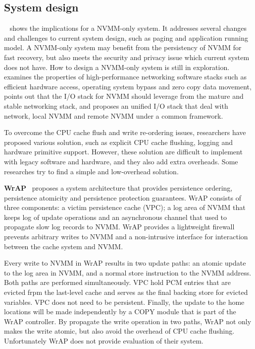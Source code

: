 \subsection{System design} 
\label{sec:systemdesign}

~\cite{systemimplications} shows the implications for a NVMM-only
system. It addresses several changes and challenges to current system design,
such as paging and application running model. A NVMM-only system may benefit
from the persistency of NVMM for fast recovery, but also meets the security
and privacy issue which current system does not have. How to design a
NVMM-only system is still in exploration. \cite{onestack} examines the
properties of high-performance networking software stacks such as efficient
hardware access, operating system bypass and zero copy data movement,
points out that the I/O stack for NVMM should leverage from the mature and
stable networking stack, and proposes an unified I/O stack that deal with
network, local NVMM and remote NVMM under a common framework.

To overcome the CPU cache flush and write re-ordering issues, researchers
have proposed various solution, such as explicit CPU cache flushing, logging
and hardware primitive support. However, these solution are difficult
to implement with legacy software and hardware, and they also add extra
overheads. Some researches try to find a simple and low-overhead solution.

\textbf{WrAP}~\cite{WrAP} proposes a system architecture
 that provides persistence
ordering, persistence atomicity and persistence protection guarantees. 
WrAP consists of three components: a victim persistence cache (VPC); a log
area of NVMM that keeps log of update operations and an asynchronous channel
that used to propagate slow log records to NVMM. WrAP provides a lightweight
firewall prevents arbitrary writes to NVMM and a non-intrusive interface
for interaction between the cache system and NVMM.

Every write to NVMM in WrAP results in two update paths: an atomic update to
the log area in NVMM, and a normal store instruction to the NVMM address. Both
paths are performed simultaneously. VPC hold PCM entries that are evicted
frpm the last-level cache and serves as the final backing store for evicted
variables. VPC does not need to be persistent.
Finally, the update to the home locations will be made
independently by a COPY module that is part of the WrAP controller. 
By propagate the write operation in two paths, WrAP not only makes the 
write atomic, but also avoid the overhead of CPU cache flushing.
Unfortunately WrAP does not provide evaluation of their system.

